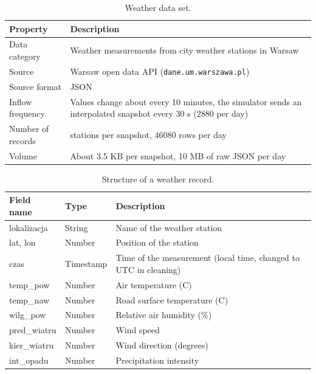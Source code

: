 \documentclass[11pt]{article}
\begin{document}
\begin{table}[H]
\centering
\caption{Weather data set.}\label{tab:ds-weather}
\begin{tabular}{|>{\raggedright\arraybackslash}p{3cm}|>{\raggedright\arraybackslash}p{11cm}|}
\hline
\textbf{Property} & \textbf{Description} \\
\hline
Data category & Weather measurements from city weather stations in Warsaw \\ \hline
Source & Warsaw open data API (\texttt{dane.um.warszawa.pl}) \\ \hline
Source format & JSON \\ \hline
Inflow frequency & Values change about every 10 minutes, the simulator sends an interpolated snapshot every 30 s (2880 per day) \\ \hline
Number of records & 16 stations per snapshot, 46080 rows per day \\ \hline
Volume & About 3.5 KB per snapshot, 10 MB of raw JSON per day \\ \hline
\end{tabular}
\end{table}

\begin{table}[H]
\centering
\caption{Structure of a weather record.}\label{tab:fields-weather}
\begin{tabular}{|>{\raggedright\arraybackslash}p{3.6cm}|>{\raggedright\arraybackslash}p{2cm}|>{\raggedright\arraybackslash}p{8cm}|}
\hline
\textbf{Field name} & \textbf{Type} & \textbf{Description} \\
\hline
lokalizacja & String & Name of the weather station \\ \hline
lat, lon & Number & Position of the station \\ \hline
czas & Timestamp & Time of the measurement (local time, changed to UTC in cleaning) \\ \hline
temp\_pow & Number & Air temperature (C) \\ \hline
temp\_naw & Number & Road surface temperature (C) \\ \hline
wilg\_pow & Number & Relative air humidity (\%) \\ \hline
pred\_wiatru & Number & Wind speed \\ \hline
kier\_wiatru & Number & Wind direction (degrees) \\ \hline
int\_opadu & Number & Precipitation intensity \\ \hline
\end{tabular}
\end{table}
\end{document}

